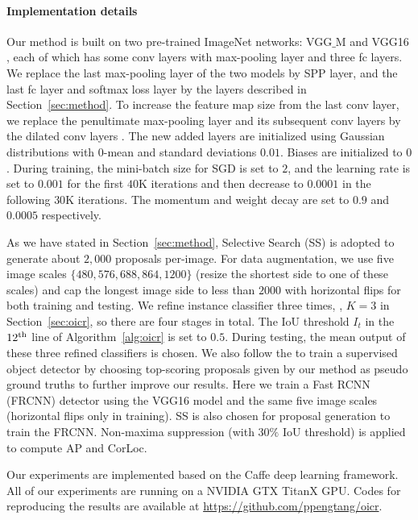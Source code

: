 \documentclass[10pt,twocolumn,letterpaper]{article}
\begin{document}
\paragraph{Implementation details}
Our method is built on two pre-trained ImageNet \cite{Ref:Deng2009} networks: VGG$\_$M \cite{Ref:Chatfield2014} and VGG16 \cite{Ref:Simonyan2015}, each of which has some conv layers with max-pooling layer and three fc layers.
We replace the last max-pooling layer of the two models by SPP layer, and the last fc layer and softmax loss layer by the layers described in Section~\ref{sec:method}.
To increase the feature map size from the last conv layer, we replace the penultimate max-pooling layer and its subsequent conv layers by the dilated conv layers \cite{Ref:Yu2016}.
The new added layers are initialized using Gaussian distributions with $0$-mean and standard deviations $0.01$.
Biases are initialized to $0$.
During training, the mini-batch size for SGD is set to $2$, and the learning rate is set to $0.001$ for the first $40$K iterations and then decrease to $0.0001$ in the following $30$K iterations.
The momentum and weight decay are set to $0.9$ and $0.0005$ respectively.

As we have stated in Section~\ref{sec:method}, Selective Search (SS) \cite{Ref:Uijlings2013} is adopted to generate about $2,000$ proposals per-image.
For data augmentation, we use five image scales $\{480, 576, 688, 864, 1200\}$ (resize the shortest side to one of these scales) and cap the longest image side to less than $2000$ with horizontal flips for both training and testing.
We refine instance classifier three times, \ie, $K=3$ in Section~\ref{sec:oicr}, so there are four stages in total.
The IoU threshold $I_{t}$ in the $12^{\textup{th}}$ line of Algorithm~\ref{alg:oicr} is set to $0.5$.
During testing, the mean output of these three refined classifiers is chosen.
We also follow the \cite{Ref:Kumar2016,Ref:Li2016} to train a supervised object detector by choosing top-scoring proposals given by our method as pseudo ground truths to further improve our results.
Here we train a Fast RCNN (FRCNN) \cite{Ref:Girshick2015} detector using the VGG16 model and the same five image scales (horizontal flips only in training).
SS is also chosen for proposal generation to train the FRCNN.
Non-maxima suppression (with $30\%$ IoU threshold) is applied to compute AP and CorLoc.

Our experiments are implemented based on the Caffe \cite{Ref:Jia2014} deep learning framework.
All of our experiments are running on a NVIDIA GTX TitanX GPU.
Codes for reproducing the results are available at \url{https://github.com/ppengtang/oicr}.
\end{document}

